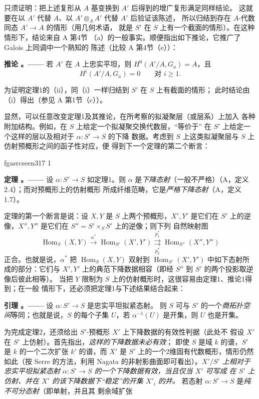 \documentclass[12pt,twoside,openany]{book}
\numberwithin{equation}{section}
\newcommand{\fgaunitid}{unbound}
\newcommand{\src}[1]{%
  \phantomsection
  \hypertarget{src:\fgaunitid:#1}{}%
  \hypertarget{fga.\fgaunitid.p#1}{}%
  \ifcsname fgasrcseen#1\endcsname\else
    \expandafter\gdef\csname fgasrcseen#1\endcsname{1}%
    \hypertarget{src:#1}{}%
  \fi
  \marginpar{\raggedleft\footnotesize\sffamily #1}%
}
\newcommand{\fquote}[1]{“#1”}
\theoremstyle{plain}
\theoremstyle{definition}
\theoremstyle{remark}
\newcommand{\result}[2]{%
  \par\medskip\noindent\textbf{#1%
  \if\relax\detokenize{#2}\relax\else\space#2\fi。——}\enspace
}
\begin{document}
只须证明：把上述复形从 $A$ 基变换到 $A'$ 后得到的增广复形满足同样结论。
这就要在以 $A'$ 代替 $A$、以 $A'\otimes_AA'$ 代替 $A'$ 后验证该陈述，
所以归结到存在 $A$-代数同态 $A'\longrightarrow A$ 的情形（用几何术语，
就是 $S'$ 在 $S$ 上有一个截面的情形）。在这种情形下，结论来自 A 第4节
（a）的一般事实。顺便指出如下推论，它推广了 Galois 上同调中一个熟知的
陈述（比较 A 第4节（e））：

\result{推论}{} 若 $A'$ 在 $A$ 上忠实平坦，则 $H^0(A'/A,G_a)=A$，且
\[
  H^i(A'/A,G_a)=0\qquad\text{对 $i\geq1$}.
\]

为证明定理1的（ii），同（i）一样归结到 $S'$ 在 $S$ 上有截面的情形；
此时结论由（i）得出（参见 A 第1节（c））。

显然，可以任意改变定理1及其推论，在所考察的拟凝聚层（或层系）上加入
各种附加结构。例如，在 $S$ 上给定一个拟凝聚交换代数层，\fquote{等价于}
在 $S'$ 上给定一个这样的层以及相对于 $\alpha:S'\longrightarrow S$ 的下降
数据。考虑到 $S$ 上这类拟凝聚层与 $S$ 上仿射预概形之间的函子性对应，便
得到下一个定理的第二个断言：

\src{317}
\result{定理}{2} 设 $\alpha:S'\longrightarrow S$ 如定理1。则 $\alpha$
是\emph{下降态射}（一般不严格）（A，定义2.4）；而对预概形上的仿射概形
所成纤维范畴，它是\emph{严格下降态射}（A，定义1.7）。

定理的第一个断言是说：设 $X,Y$ 是 $S$ 上两个预概形，$X',Y'$ 是它们在
$S'$ 上的逆像，$X'',Y''$ 是它们在 $S''=S'\times_SS'$ 上的逆像；则下列
自然映射图
\[
  \operatorname{Hom}_S(X,Y)\xrightarrow{\alpha^*}
  \operatorname{Hom}_{S'}(X',Y')
  \underset{p_2^*}{\overset{p_1^*}{\rightrightarrows}}
  \operatorname{Hom}_{S''}(X'',Y'')
\]
正合。也就是说，$\alpha^*$ 把 $\operatorname{Hom}_S(X,Y)$ 双射到
$\operatorname{Hom}_{S'}(X',Y')$ 中如下态射所成的部分：它们与 $X',Y'$
上的典范下降数据相容（即经 $S''$ 到 $S'$ 的两个投影取逆像后彼此相等）。
当把 $Y$ 限制为 $S$ 上的仿射概形时，这很容易由定理1、推论1得到；在一般
情形下，还必须把定理1与下述结果结合起来：

\result{引理}{1.2} 设 $\alpha:S'\longrightarrow S$ 是忠实平坦拟紧态射。
则 $S$ 可与 $S'$ 的一个\emph{商拓扑空间}等同；也就是说，$S$ 的每个子集
$U$，若 $\alpha^{-1}(U)$ 是开集，则 $U$ 也是开集。

为完成定理2，还须给出 $S'$-预概形 $X'$ 上下降数据的有效性判据（此处不
假设 $X'$ 在 $S'$ 上仿射）。首先指出，\emph{这样的下降数据未必有效}；
即使 $S$ 是域 $k$ 的谱，$S'$ 是 $k$ 的一个二次扩张 $k'$ 的谱，而 $X'$
是 $S'$ 上的一个2维固有代数概形，情形仍然如此（按 Serre 的方法，利用
Nagata 的非射影曲面即可看出）。\emph{$X'/S'$ 上相对于忠实平坦拟紧态射
$\alpha:S'\longrightarrow S$ 的一个下降数据有效，当且仅当 $X'$ 可写成
在 $S'$ 上仿射、并在 $X'$ 的该下降数据下\fquote{稳定}的开集 $X'_i$ 的并。}
若态射 $\alpha:S'\longrightarrow S$ 是\emph{纯不可分态射}（即单射，并且其
剩余域扩张
\end{document}
